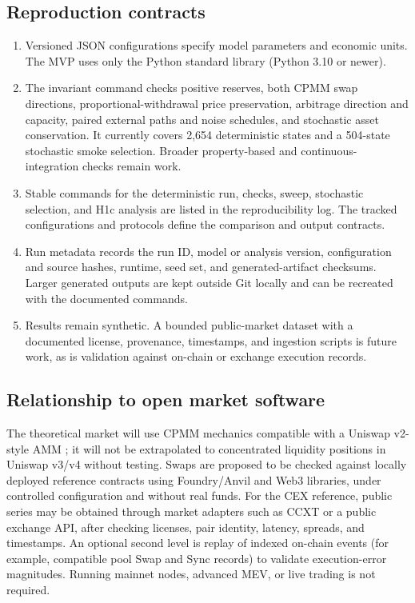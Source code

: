 \subsection{Reproduction contracts}

\begin{enumerate}
  \item Versioned JSON configurations specify model parameters and economic units.
    The MVP uses only the Python standard library (Python 3.10 or newer).
  \item The invariant command checks positive reserves, both CPMM swap directions,
    proportional-withdrawal price preservation, arbitrage direction and capacity,
    paired external paths and noise schedules, and stochastic asset conservation.
    It currently covers 2,654 deterministic states and a 504-state stochastic smoke
    selection. Broader property-based and continuous-integration checks remain work.
  \item Stable commands for the deterministic run, checks, sweep, stochastic selection,
    and H1c analysis are listed in the reproducibility log. The tracked configurations
    and protocols define the comparison and output contracts.
  \item Run metadata records the run ID, model or analysis version, configuration and
    source hashes, runtime, seed set, and generated-artifact checksums. Larger generated
    outputs are kept outside Git locally and can be recreated with the documented
    commands.
  \item Results remain synthetic. A bounded public-market dataset with a documented
    license, provenance, timestamps, and ingestion scripts is future work, as is
    validation against on-chain or exchange execution records.
\end{enumerate}

\subsection{Relationship to open market software}

The theoretical market will use CPMM mechanics compatible with a Uniswap v2-style AMM
\cite{adams2020uniswap,angeris2020cfmm}; it will not be extrapolated to concentrated
liquidity positions in Uniswap v3/v4 without testing. Swaps are proposed to be checked
against locally deployed reference contracts using Foundry/Anvil and Web3 libraries,
under controlled configuration and without real funds. For the CEX reference, public
series may be obtained through market adapters such as CCXT or a public exchange API,
after checking licenses, pair identity, latency, spreads, and timestamps. An optional
second level is replay of indexed on-chain events (for example, compatible pool Swap
and Sync records) to validate execution-error magnitudes. Running mainnet nodes,
advanced MEV, or live trading is not required.
